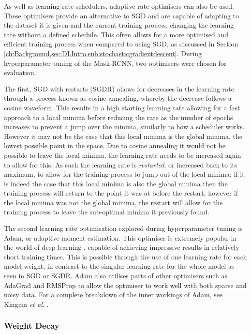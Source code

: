 As well as learning rate schedulers, adaptive rate optimisers can also be used. These optimisers provide an alternative to SGD and are capable of adapting to the dataset it is given and the current training process, changing the learning rate without a defined schedule. This often allows for a more optimised and efficient training process when compared to using SGD, as discussed in Section \ref{ch:Background,sec:DLIntro,sub:stochasticgradientdescent}. During hyperparameter tuning of the Mask-RCNN, two optimisers were chosen for evaluation. 

The first, SGD with restarts (SGDR) \cite{loshchilov_sgdr:_2016} allows for decreases in the learning rate through a process known as cosine annealing, whereby the decrease follows a cosine waveform. This results in a high starting learning rate allowing for a fast approach to a local minima before reducing the rate as the number of epochs increases to prevent a jump over the minima, similarly to how a scheduler works. However it may not be the case that this local minima is the global minima, the lowest possible point in the space. Due to cosine annealing it would not be possible to leave the local minima, the learning rate needs to be increased again to allow for this. As such the learning rate is \textit{restarted}, or increased back to its maximum, to allow for the training process to jump out of the local minima; if it is indeed the case that this local minima is also the global minima then the training process will return to the point it was at before the restart, however if the local minima was not the global minima, the restart will allow for the training process to leave the sub-optimal minima it previously found. 

The second learning rate optimisation explored during hyperparameter tuning is Adam, or adaptive moment estimation. This optimiser is extremely popular in the world of deep learning \cite{karpathy_peek_2017}, capable of achieving impressive results in relatively short training times. This is possible through the use of one learning rate for each model weight, in contrast to the singular learning rate for the whole model as seen in SGD or SGDR. Adam also utilises parts of other optimisers such as AdaGrad \cite{duchi_adaptive_2011} and RMSProp \cite{tieleman_lecture_2012} to allow the optimiser to work well with both sparse and noisy data. For a complete breakdown of the inner workings of Adam, see Kingma \textit{et al}. \cite{kingma_adam:_2014}. 

\subsubsection{Weight Decay}\label{ch:cetDet,sec:ModelSelection,sub:TrainingHyperparameters,subsub:WeightDecay}

